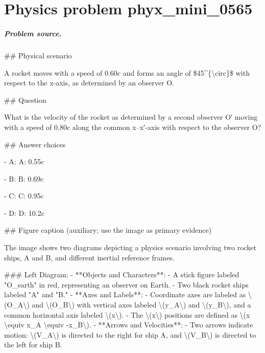 
\chapter{Physics problem phyx\_mini\_0565}
\label{ch:PhyXMiniProblems_problem_phyx_mini_0565}

\paragraph{Problem source.}
\#\# Physical scenario

A rocket moves with a speed of 0.60c and forms an angle of \$45\textasciicircum{}\{\textbackslash{}circ\}\$ with respect to the x-axis, as determined by an observer O.

\#\# Question

What is the velocity of the rocket as determined by a second observer O′ moving with a speed of 0.80c along the common x–x′-axis with respect to the observer O?

\#\# Answer choices

- A: A: 0.55c

- B: B: 0.69c

- C: C: 0.95c

- D: D: 10.2c

\#\# Figure caption (auxiliary; use the image as primary evidence)

The image shows two diagrams depicting a physics scenario involving two rocket ships, A and B, and different inertial reference frames.

\#\#\# Left Diagram:
- **Objects and Characters**:
  - A stick figure labeled "O\_earth" in red, representing an observer on Earth.
  - Two black rocket ships labeled "A" and "B."
- **Axes and Labels**:
  - Coordinate axes are labeled as \textbackslash{}(O\_A\textbackslash{}) and \textbackslash{}(O\_B\textbackslash{}) with vertical axes labeled \textbackslash{}(y\_A\textbackslash{}) and \textbackslash{}(y\_B\textbackslash{}), and a common horizontal axis labeled \textbackslash{}(x\textbackslash{}).
  - The \textbackslash{}(x\textbackslash{}) positions are defined as \textbackslash{}(x \textbackslash{}equiv x\_A \textbackslash{}equiv -x\_B\textbackslash{}).
- **Arrows and Velocities**:
  - Two arrows indicate motion: \textbackslash{}(V\_A\textbackslash{}) is directed to the right for ship A, and \textbackslash{}(V\_B\textbackslash{}) is directed to the left for ship B.


